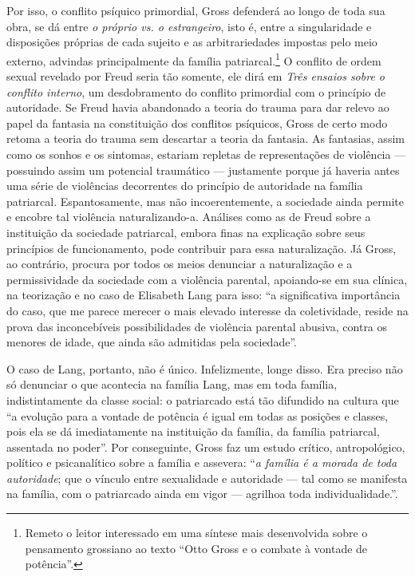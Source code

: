 Por isso, o conflito psíquico primordial, Gross defenderá ao longo de
toda sua obra, se dá entre \emph{o próprio vs. o estrangeiro}, isto é,
entre a singularidade e disposições próprias de cada sujeito e as
arbitrariedades impostas pelo meio externo, advindas principalmente da
família patriarcal.\footnote{Remeto o leitor interessado em uma síntese
  mais desenvolvida sobre o pensamento grossiano ao texto ``Otto Gross e
  o combate à vontade de potência''.} O conflito de ordem sexual
revelado por Freud seria tão somente, ele dirá em \emph{Três ensaios
sobre o conflito interno}, um desdobramento do conflito primordial com
o princípio de autoridade. Se Freud havia abandonado a teoria do trauma
para dar relevo ao papel da fantasia na constituição dos conflitos
psíquicos, Gross de certo modo retoma a teoria do trauma sem descartar a
teoria da fantasia. As fantasias, assim como os sonhos e os sintomas,
estariam repletas de representações de violência --- possuindo assim um
potencial traumático --- justamente porque já haveria antes uma série de
violências decorrentes do princípio de autoridade na família patriarcal.
Espantosamente, mas não incoerentemente, a sociedade ainda permite e
encobre tal violência naturalizando-a. Análises como as de Freud sobre a
instituição da sociedade patriarcal, embora finas na explicação sobre
seus princípios de funcionamento, pode contribuir para essa
naturalização. Já Gross, ao contrário, procura por todos os meios
denunciar a naturalização e a permissividade da sociedade com a
violência parental, apoiando-se em sua clínica, na teorização e no caso
de Elisabeth Lang para isso: ``a significativa importância do caso, que
me parece merecer o mais elevado interesse da coletividade, reside na
prova das inconcebíveis possibilidades de violência parental abusiva,
contra os menores de idade, que ainda são admitidas pela sociedade''.

O caso de Lang, portanto, não é único. Infelizmente, longe disso. Era
preciso não só denunciar o que acontecia na família Lang, mas em toda
família, indistintamente da classe social: o patriarcado está tão
difundido na cultura que ``a evolução para a vontade de potência é igual
em todas as posições e classes, pois ela se dá imediatamente na
instituição da família, da família patriarcal, assentada no poder''.
Por conseguinte, Gross faz um estudo crítico, antropológico, político e
psicanalítico sobre a família e assevera: ``\emph{a família é a morada
de toda autoridade}; que o vínculo entre sexualidade e autoridade ---
tal como se manifesta na família, com o patriarcado ainda em vigor ---
agrilhoa toda individualidade.''.

